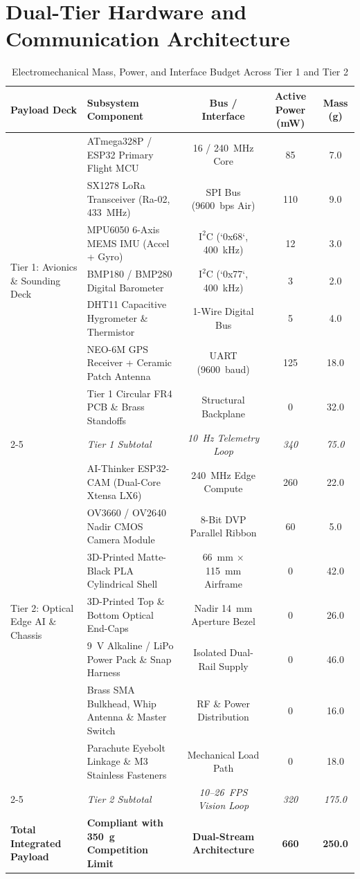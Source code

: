 \documentclass[conference]{IEEEtran}
\begin{document}
\section{Dual-Tier Hardware and Communication Architecture}

\begin{table}[t]
\centering
\caption{Electromechanical Mass, Power, and Interface Budget Across Tier 1 and Tier 2}
\label{tab:hardware_budget}
\begin{tabular}{llccc}
\toprule
\textbf{Payload Deck} & \textbf{Subsystem Component} & \textbf{Bus / Interface} & \textbf{Active Power (mW)} & \textbf{Mass (g)} \\
\midrule
\multirow{7}{*}{Tier 1: Avionics \& Sounding Deck} 
 & ATmega328P / ESP32 Primary Flight MCU & 16 / 240~MHz Core & 85 & 7.0 \\
 & SX1278 LoRa Transceiver (Ra-02, 433~MHz) & SPI Bus (9600~bps Air) & 110 & 9.0 \\
 & MPU6050 6-Axis MEMS IMU (Accel + Gyro) & $\text{I}^2\text{C}$ (`0x68`, 400~kHz) & 12 & 3.0 \\
 & BMP180 / BMP280 Digital Barometer & $\text{I}^2\text{C}$ (`0x77`, 400~kHz) & 3 & 2.0 \\
 & DHT11 Capacitive Hygrometer \& Thermistor & 1-Wire Digital Bus & 5 & 4.0 \\
 & NEO-6M GPS Receiver + Ceramic Patch Antenna & UART (9600~baud) & 125 & 18.0 \\
 & Tier 1 Circular FR4 PCB \& Brass Standoffs & Structural Backplane & 0 & 32.0 \\
\cmidrule{2-5}
 & \textit{Tier 1 Subtotal} & \textit{10~Hz Telemetry Loop} & \textit{340} & \textit{75.0} \\
\midrule
\multirow{7}{*}{Tier 2: Optical Edge AI \& Chassis} 
 & AI-Thinker ESP32-CAM (Dual-Core Xtensa LX6) & 240~MHz Edge Compute & 260 & 22.0 \\
 & OV3660 / OV2640 Nadir CMOS Camera Module & 8-Bit DVP Parallel Ribbon & 60 & 5.0 \\
 & 3D-Printed Matte-Black PLA Cylindrical Shell & 66~mm $\times$ 115~mm Airframe & 0 & 42.0 \\
 & 3D-Printed Top \& Bottom Optical End-Caps & Nadir 14~mm Aperture Bezel & 0 & 26.0 \\
 & 9~V Alkaline / LiPo Power Pack \& Snap Harness & Isolated Dual-Rail Supply & 0 & 46.0 \\
 & Brass SMA Bulkhead, Whip Antenna \& Master Switch & RF \& Power Distribution & 0 & 16.0 \\
 & Parachute Eyebolt Linkage \& M3 Stainless Fasteners & Mechanical Load Path & 0 & 18.0 \\
\cmidrule{2-5}
 & \textit{Tier 2 Subtotal} & \textit{10--26~FPS Vision Loop} & \textit{320} & \textit{175.0} \\
\midrule
\textbf{Total Integrated Payload} & \textbf{Compliant with 350~g Competition Limit} & \textbf{Dual-Stream Architecture} & \textbf{660} & \textbf{250.0} \\
\bottomrule
\end{tabular}
\end{table}
\end{document}
